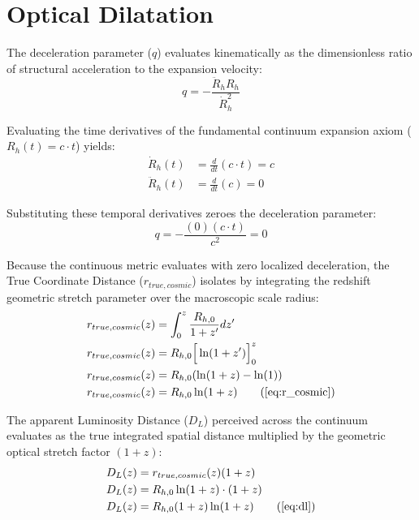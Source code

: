 \section{Optical Dilatation}
\label{sec:deriv_optical_dilatation}

The deceleration parameter ($q$) evaluates kinematically as the dimensionless ratio of structural acceleration to the expansion velocity:
\begin{equation}
    q = -\frac{\ddot{R}_h R_h}{\dot{R}_h^2}
\end{equation}

Evaluating the time derivatives of the fundamental continuum expansion axiom ($R_h(t) = c \cdot t$) yields:
\begin{align}
    \dot{R}_h(t) &= \frac{d}{dt}(c \cdot t) = c \\
    \ddot{R}_h(t) &= \frac{d}{dt}(c) = 0
\end{align}

Substituting these temporal derivatives zeroes the deceleration parameter: %
\begin{equation}
    q = -\frac{(0)(c \cdot t)}{c^2} = 0
\end{equation}

Because the continuous metric evaluates with zero localized deceleration, the True Coordinate Distance ($r_{true, cosmic}$) isolates by integrating the redshift geometric stretch parameter over the macroscopic scale radius:
\begin{align}
    r_{true, cosmic}(z) &= \int_0^z \frac{R_{h,0}}{1+z'} dz' \\
    r_{true, cosmic}(z) &= R_{h,0} \Big[\ln(1+z')\Big]_0^z \\
    r_{true, cosmic}(z) &= R_{h,0} (\ln(1+z) - \ln(1)) \\
    r_{true, cosmic}(z) &= R_{h,0} \ln(1+z) \tag{\ref{eq:r_cosmic}} %
\end{align}

The apparent Luminosity Distance ($D_L$) perceived across the continuum evaluates as the true integrated spatial distance multiplied by the geometric optical stretch factor $(1+z)$:
\begin{align}
    D_L(z) &= r_{true, cosmic}(z)(1+z) \\
    D_L(z) &= R_{h,0} \ln(1+z) \cdot (1+z) \\
    D_L(z) &= R_{h,0} (1+z) \ln(1+z) \tag{\ref{eq:dl}} %
\end{align}

